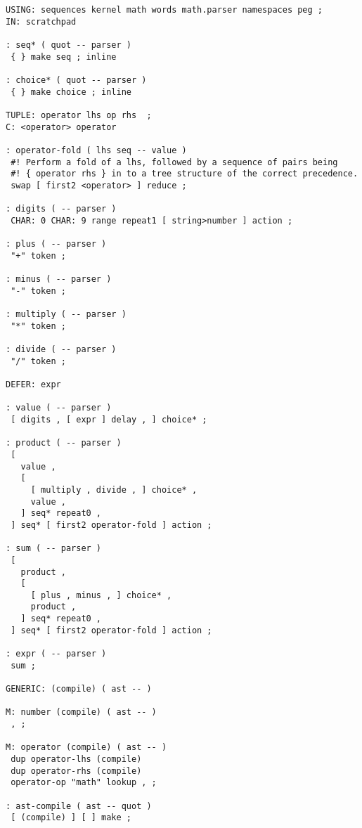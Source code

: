 \begin{verbatim}
USING: sequences kernel math words math.parser namespaces peg ;
IN: scratchpad

: seq* ( quot -- parser )
 { } make seq ; inline

: choice* ( quot -- parser )
 { } make choice ; inline

TUPLE: operator lhs op rhs  ;
C: <operator> operator

: operator-fold ( lhs seq -- value )
 #! Perform a fold of a lhs, followed by a sequence of pairs being
 #! { operator rhs } in to a tree structure of the correct precedence.
 swap [ first2 <operator> ] reduce ;

: digits ( -- parser )
 CHAR: 0 CHAR: 9 range repeat1 [ string>number ] action ;

: plus ( -- parser )
 "+" token ;

: minus ( -- parser )
 "-" token ;

: multiply ( -- parser )
 "*" token ;

: divide ( -- parser )
 "/" token ;

DEFER: expr

: value ( -- parser )
 [ digits , [ expr ] delay , ] choice* ;

: product ( -- parser )
 [
   value ,
   [
     [ multiply , divide , ] choice* ,
     value ,
   ] seq* repeat0 ,
 ] seq* [ first2 operator-fold ] action ;

: sum ( -- parser )
 [
   product ,
   [
     [ plus , minus , ] choice* ,
     product ,
   ] seq* repeat0 ,
 ] seq* [ first2 operator-fold ] action ;

: expr ( -- parser )
 sum ;

GENERIC: (compile) ( ast -- )

M: number (compile) ( ast -- )
 , ;

M: operator (compile) ( ast -- )
 dup operator-lhs (compile)
 dup operator-rhs (compile)
 operator-op "math" lookup , ;

: ast-compile ( ast -- quot )
 [ (compile) ] [ ] make ;
\end{verbatim}
